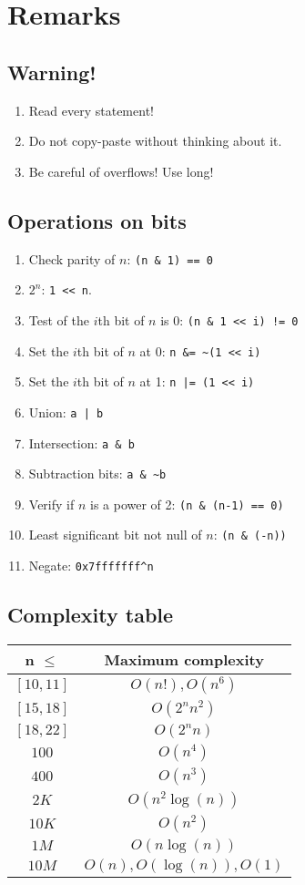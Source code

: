 \section{Remarks}
\subsection{Warning!}
\begin{enumerate}
	\item Read every statement!
	\item Do not copy-paste without thinking about it.
	\item Be careful of overflows! Use long! 
\end{enumerate}
 
\subsection{Operations on bits}
\begin{enumerate}
	\item Check parity of $n$: \lstinline{(n & 1) == 0}
	\item $2^n$: \lstinline|1 << n|.
	\item Test of the $i$th bit of $n$ is $0$: \lstinline{(n & 1 << i) != 0}
	\item Set the $i$th bit of $n$ at 0: \lstinline{n &= ~(1 << i)}
	\item Set the $i$th bit of $n$ at 1: \lstinline{n |= (1 << i)}
	\item Union: \lstinline{a | b}
	\item Intersection: \lstinline{a & b}
	\item Subtraction bits: \lstinline{a & ~b}
	\item Verify if $n$ is a power of 2: \lstinline{(n & (n-1) == 0)}
	\item Least significant bit not null of $n$: \lstinline{(n & (-n))}
	\item Negate: \lstinline{0x7fffffff^n}
\end{enumerate}

\subsection{Complexity table}
\begin{center}
\begin{tabular}{|c|c|}
\hline
n $\leq$ & Maximum complexity\\
\hline
$[10,11]$ & $O(n!),O(n^6)$ \\
$[15,18]$ & $O(2^n n^2)$\\
$[18,22]$ & $O(2^n n)$\\
$100$ & $O(n^4)$\\
$400$ & $O(n^3)$\\
$2K$ & $O(n^2\log(n))$\\
$10K$ & $O(n^2)$\\
$1M$ & $O(n\log(n))$\\
$10M$ & $O(n),O(\log(n)),O(1)$\\
\hline
\end{tabular}
\end{center}